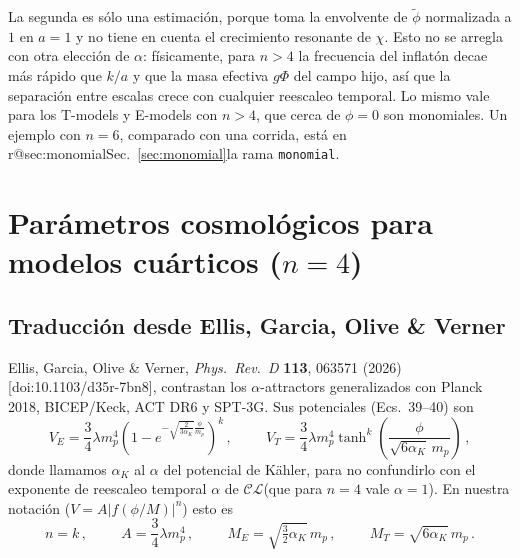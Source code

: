 \documentclass[11pt]{article}
\makeatletter
\newcommand{\CosmoLattice}{\ensuremath{\mathcal{C}}\text{osmo}\ensuremath{\mathcal{L}}\text{attice}\xspace}
\newcommand{\reframa}[2]{\ifcsname r@#1\endcsname Sec.~\ref{#1}\else la rama \texttt{#2}\fi}
\makeatother
\begin{document}
            La segunda es sólo una estimación, porque toma la envolvente de $\tilde\phi$ normalizada a $1$ en $a = 1$ y no tiene en cuenta el crecimiento resonante de $\chi$. Esto no se arregla con otra elección de $\alpha$: físicamente, para $n > 4$ la frecuencia del inflatón decae más rápido que $k/a$ y que la masa efectiva $g \Phi$ del campo hijo, así que la separación entre escalas crece con cualquier reescaleo temporal. Lo mismo vale para los T-models y E-models con $n > 4$, que cerca de $\phi = 0$ son monomiales.
            Un ejemplo con $n = 6$, comparado con una corrida, está en \reframa{sec:monomial}{monomial}.

    \section{Parámetros cosmológicos para modelos cuárticos ($n = 4$)}
        \label{sec:parametros-cuarticos}

        \subsection{Traducción desde Ellis, Garcia, Olive \& Verner}

            Ellis, Garcia, Olive \& Verner, \emph{Phys.\ Rev.\ D} \textbf{113}, 063571 (2026) [doi:10.1103/d35r-7bn8], contrastan los $\alpha$-attractors generalizados con Planck 2018, BICEP/Keck, ACT DR6 y SPT-3G. Sus potenciales (Ecs.~39--40) son
            \begin{equation}
                V_E = \frac{3}{4} \lambda m_p^4 \left( 1 - e^{-\sqrt{\frac{2}{3\alpha_K}} \frac{\phi}{m_p}} \right)^k \, ,
                \hspace{1cm}
                V_T = \frac{3}{4} \lambda m_p^4 \tanh^k \left( \frac{\phi}{\sqrt{6 \alpha_K} \, m_p} \right) \, ,
            \end{equation}
            donde llamamos $\alpha_K$ al $\alpha$ del potencial de Kähler, para no confundirlo con el exponente de reescaleo temporal $\alpha$ de \CosmoLattice (que para $n = 4$ vale $\alpha = 1$). En nuestra notación ($V = A |f(\phi/M)|^n$) esto es
            \begin{equation}
                n = k \, , \hspace{1cm}
                A = \frac{3}{4} \lambda m_p^4 \, , \hspace{1cm}
                M_E = \sqrt{\tfrac{3}{2} \alpha_K} \, m_p \, , \hspace{1cm}
                M_T = \sqrt{6 \alpha_K} \, m_p \, .
            \end{equation}
\end{document}
